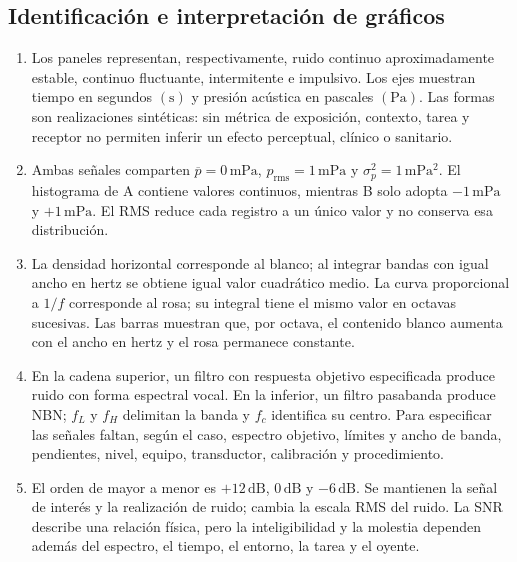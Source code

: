 \subsection*{Identificación e interpretación de gráficos}

\begin{enumerate}[label=\textbf{V\arabic*.},leftmargin=*]
    \item Los paneles representan, respectivamente, ruido continuo
    aproximadamente estable, continuo fluctuante, intermitente e impulsivo.
    Los ejes muestran tiempo en segundos \((\mathrm{s})\) y presión acústica
    en pascales \((\mathrm{Pa})\). Las formas son realizaciones sintéticas:
    sin métrica de exposición, contexto, tarea y receptor no permiten
    inferir un efecto perceptual, clínico o sanitario.

    \item Ambas señales comparten
    \(\overline p=0\,\mathrm{mPa}\),
    \(p_{\mathrm{rms}}=1\,\mathrm{mPa}\) y
    \(\sigma_p^2=1\,\mathrm{mPa^2}\). El histograma de A contiene valores
    continuos, mientras B solo adopta \(-1\,\mathrm{mPa}\) y
    \(+1\,\mathrm{mPa}\). El RMS reduce cada registro a un único valor y no
    conserva esa distribución.

    \item La densidad horizontal corresponde al blanco; al integrar bandas con
    igual ancho en hertz se obtiene igual valor cuadrático medio. La curva
    proporcional a \(1/f\) corresponde al rosa; su integral tiene el mismo
    valor en octavas sucesivas. Las barras muestran que, por octava, el
    contenido blanco aumenta con el ancho en hertz y el rosa permanece
    constante.

    \item En la cadena superior, un filtro con respuesta objetivo especificada
    produce ruido con forma espectral vocal. En la inferior, un filtro
    pasabanda produce NBN; \(f_L\) y \(f_H\) delimitan la banda y \(f_c\)
    identifica su centro. Para especificar las señales faltan, según el caso,
    espectro objetivo, límites y ancho de banda, pendientes, nivel, equipo,
    transductor, calibración y procedimiento.

    \item El orden de mayor a menor es
    \(+12\,\mathrm{dB}\), \(0\,\mathrm{dB}\) y
    \(-6\,\mathrm{dB}\). Se mantienen la señal de interés y la realización de
    ruido; cambia la escala RMS del ruido. La SNR describe una relación física,
    pero la inteligibilidad y la molestia dependen además del espectro, el
    tiempo, el entorno, la tarea y el oyente.


\end{enumerate}
